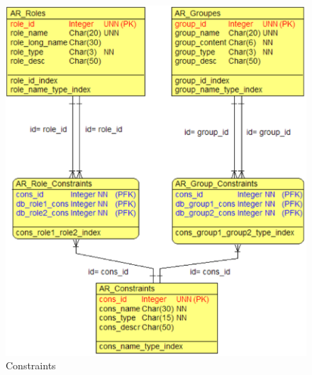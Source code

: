 \begin{figure}
\begin{center}%
   \includegraphics[scale=1]{./access-control/ar_constraints.eps}
   \caption{Constraints}
   \label{fig:constraints}
\end{center}
\end{figure}

